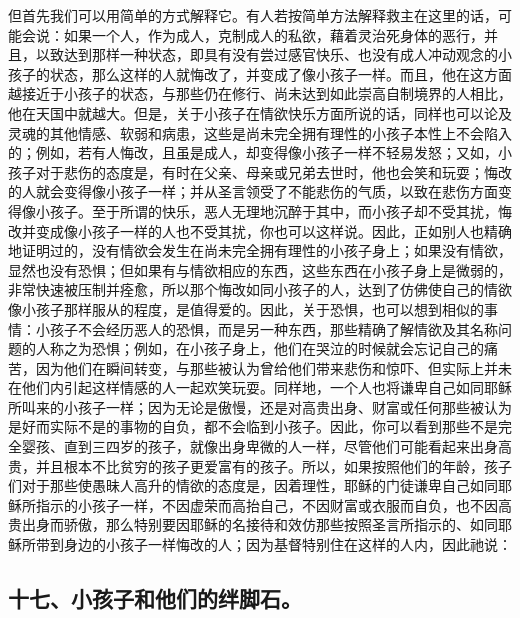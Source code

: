 但首先我们可以用简单的方式解释它。有人若按简单方法解释救主在这里的话，可能会说：如果一个人，作为成人，克制成人的私欲，藉着灵治死身体的恶行，并且，以致达到那样一种状态，即具有没有尝过感官快乐、也没有成人冲动观念的小孩子的状态，那么这样的人就悔改了，并变成了像小孩子一样。而且，他在这方面越接近于小孩子的状态，与那些仍在修行、尚未达到如此崇高自制境界的人相比，他在天国中就越大。但是，关于小孩子在情欲快乐方面所说的话，同样也可以论及灵魂的其他情感、软弱和病患，这些是尚未完全拥有理性的小孩子本性上不会陷入的；例如，若有人悔改，且虽是成人，却变得像小孩子一样不轻易发怒；又如，小孩子对于悲伤的态度是，有时在父亲、母亲或兄弟去世时，他也会笑和玩耍；悔改的人就会变得像小孩子一样；并从圣言领受了不能悲伤的气质，以致在悲伤方面变得像小孩子。至于所谓的快乐，恶人无理地沉醉于其中，而小孩子却不受其扰，悔改并变成像小孩子一样的人也不受其扰，你也可以这样说。因此，正如别人也精确地证明过的，没有情欲会发生在尚未完全拥有理性的小孩子身上；如果没有情欲，显然也没有恐惧；但如果有与情欲相应的东西，这些东西在小孩子身上是微弱的，非常快速被压制并痊愈，所以那个悔改如同小孩子的人，达到了仿佛使自己的情欲像小孩子那样服从的程度，是值得爱的。因此，关于恐惧，也可以想到相似的事情：小孩子不会经历恶人的恐惧，而是另一种东西，那些精确了解情欲及其名称问题的人称之为恐惧；例如，在小孩子身上，他们在哭泣的时候就会忘记自己的痛苦，因为他们在瞬间转变，与那些被认为曾给他们带来悲伤和惊吓、但实际上并未在他们内引起这样情感的人一起欢笑玩耍。同样地，一个人也将谦卑自己如同耶稣所叫来的小孩子一样；因为无论是傲慢，还是对高贵出身、财富或任何那些被认为是好而实际不是的事物的自负，都不会临到小孩子。因此，你可以看到那些不是完全婴孩、直到三四岁的孩子，就像出身卑微的人一样，尽管他们可能看起来出身高贵，并且根本不比贫穷的孩子更爱富有的孩子。所以，如果按照他们的年龄，孩子们对于那些使愚昧人高升的情欲的态度是，因着理性，耶稣的门徒谦卑自己如同耶稣所指示的小孩子一样，不因虚荣而高抬自己，不因财富或衣服而自负，也不因高贵出身而骄傲，那么特别要因耶稣的名接待和效仿那些按照圣言所指示的、如同耶稣所带到身边的小孩子一样悔改的人；因为基督特别住在这样的人内，因此祂说：\par


\subsection{十七、小孩子和他们的绊脚石。}

